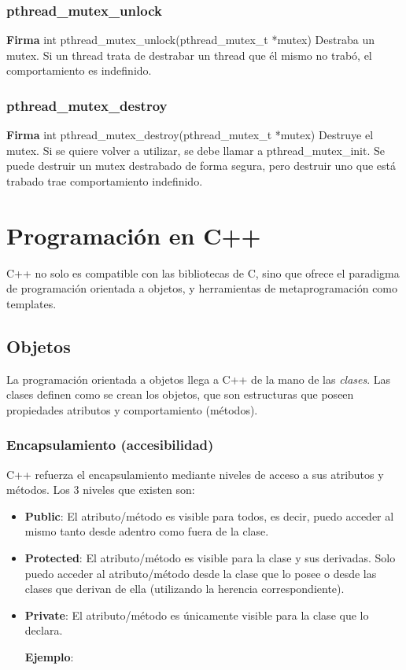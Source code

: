 \documentclass[oneside]{article}
\begin{document}
			\subsubsection{pthread\_mutex\_unlock}
			\textbf{Firma} int pthread\_mutex\_unlock(pthread\_mutex\_t *mutex)
			Destraba un mutex. Si un thread trata de destrabar un thread que él mismo no trabó, el comportamiento es indefinido.

			\subsubsection{pthread\_mutex\_destroy}
			\textbf{Firma} int pthread\_mutex\_destroy(pthread\_mutex\_t *mutex)
			Destruye el mutex. Si se quiere volver a utilizar, se debe llamar a pthread\_mutex\_init. Se puede destruir un mutex destrabado de forma segura, pero destruir uno que está trabado trae comportamiento indefinido.

\pagebreak

\section{Programación en C++}
	C++ no solo es compatible con las bibliotecas de C, sino que ofrece el paradigma de programación orientada a objetos, y herramientas de metaprogramación como templates.
	\subsection{Objetos}
	La programación orientada a objetos llega a C++ de la mano de las \emph{clases}. Las clases definen como se crean los objetos, que son estructuras que poseen propiedades atributos y comportamiento (métodos).
		\subsubsection{Encapsulamiento (accesibilidad)}
		C++ refuerza el encapsulamiento mediante niveles de acceso a sus atributos y métodos. Los 3 niveles que existen son:
		\begin{itemize}
			\item \textbf{Public}: El atributo/método es visible para todos, es decir, puedo acceder al mismo tanto desde adentro como fuera de la clase.
			\item \textbf{Protected}: El atributo/método es visible para la clase y sus derivadas. Solo puedo acceder al atributo/método desde la clase que lo posee o desde las clases que derivan de ella (utilizando la herencia correspondiente).
			\item \textbf{Private}: El atributo/método es únicamente visible para la clase que lo declara.

		\textbf{Ejemplo}:
		

		\end{itemize}
\end{document}
